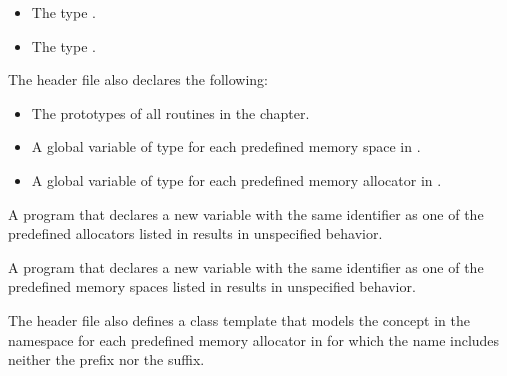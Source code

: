 \begin{ccppspecific}
\begin{itemize}
\item The type .

\item The type .

\end{itemize}

The header file also declares the following:

\begin{itemize}
\item The prototypes of all routines in the chapter.

\item A global variable of type  for each predefined memory space in .

\item A global variable of type  for each predefined memory allocator in .

\end{itemize}

A program that declares a new variable with the same identifier as one of the predefined allocators listed in  results in unspecified behavior.

A program that declares a new variable with the same identifier as one of the predefined memory spaces listed in  results in unspecified behavior.


\end{ccppspecific}


\begin{cppspecific}
The  header file also defines a class template that
models the  concept in the 
namespace for each predefined memory allocator in
 for which the name includes
neither the  prefix nor the  suffix.
\end{cppspecific}


